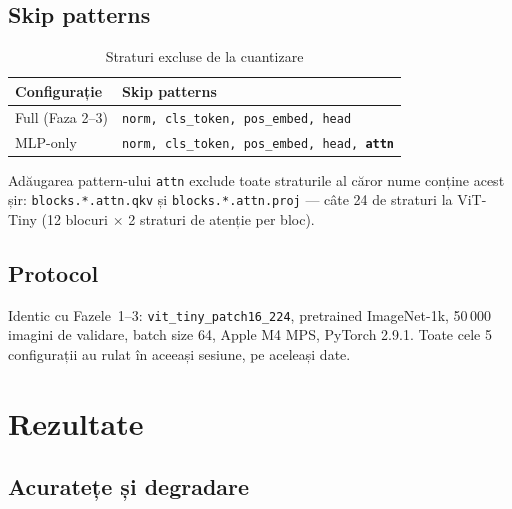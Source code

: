 \documentclass[12pt,a4paper]{article}
\begin{document}
\subsection{Skip patterns}

\begin{table}[H]
  \centering
  \caption{Straturi excluse de la cuantizare}
  \begin{tabular}{ll}
    \toprule
    \textbf{Configurație} & \textbf{Skip patterns} \\
    \midrule
    Full (Faza 2--3)  & \texttt{norm, cls\_token, pos\_embed, head} \\
    MLP-only          & \texttt{norm, cls\_token, pos\_embed, head, \textbf{attn}} \\
    \bottomrule
  \end{tabular}
  \label{tab:skip_patterns}
\end{table}

Adăugarea pattern-ului \texttt{attn} exclude toate straturile al căror
nume conține acest șir: \texttt{blocks.*.attn.qkv} și
\texttt{blocks.*.attn.proj} --- câte 24 de straturi la ViT-Tiny (12
blocuri $\times$ 2 straturi de atenție per bloc).

\subsection{Protocol}

Identic cu Fazele~1--3: \texttt{vit\_tiny\_patch16\_224}, pretrained
ImageNet-1k, 50\,000 imagini de validare, batch size 64, Apple M4 MPS,
PyTorch 2.9.1. Toate cele 5 configurații au rulat în aceeași sesiune,
pe aceleași date.

\section{Rezultate}

\subsection{Acuratețe și degradare}
\end{document}
